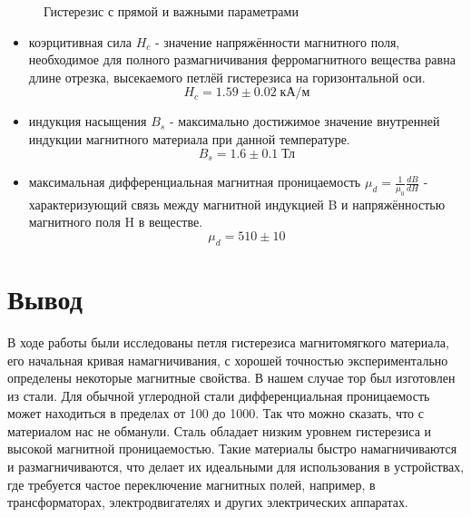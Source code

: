 \documentclass[a4paper, 12pt]{article}
\begin{document}
\begin{figure}[H]
\begin{minipage}[b]{0.45\linewidth}
        \caption{Гистерезис с прямой и важными параметрами}
        \label{fig:graph2}
    \end{minipage}
    \label{fig:graphs}
\end{figure}

\begin{itemize}
    \item коэрцитивная сила $H_c$ - значение напряжённости магнитного поля, необходимое для полного размагничивания ферромагнитного вещества равна длине отрезка, высекаемого петлёй гистерезиса на горизонтальной оси. 
    \begin{equation}
        H_c = 1.59 \pm 0.02 \; \text{кА/м}
    \end{equation}
    \item индукция насыщения $B_s$ -  максимально достижимое значение внутренней индукции магнитного материала при данной температуре. 
    \begin{equation}
        B_s = 1.6 \pm 0.1 \; \text{Тл}
    \end{equation}
    \item максимальная дифференциальная магнитная проницаемость $\mu_d = \frac{1}{\mu_0}\frac{dB}{dH}$ - характеризующий связь между магнитной индукцией B и напряжённостью магнитного поля H в веществе. 
    \begin{equation}
        \mu_{d} = 510 \pm 10
    \end{equation}
\end{itemize}

\section*{Вывод} 
В ходе работы были исследованы петля гистерезиса магнитомягкого материала, его начальная кривая намагничивания, с хорошей точностью экспериментально определены некоторые магнитные свойства. В нашем случае тор был изготовлен из стали. Для обычной углеродной стали дифференциальная проницаемость может находиться в пределах от 100 до 1000. Так что можно сказать, что с материалом нас не обманули. Сталь обладает низким уровнем гистерезиса и высокой магнитной проницаемостью. Такие материалы быстро намагничиваются и размагничиваются, что делает их идеальными для использования в устройствах, где требуется частое переключение магнитных полей, например, в трансформаторах, электродвигателях и других электрических аппаратах.
\end{document}
